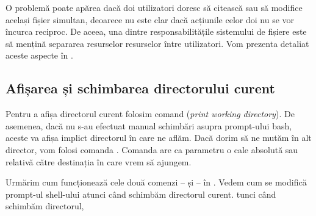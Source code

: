 O problemă poate apărea dacă doi utilizatori doresc să citească sau să modifice același fișier simultan, deoarece nu este clar dacă acțiunile celor doi nu se vor încurca reciproc. De aceea, una dintre responsabilitățile sistemului de fișiere este să mențină separarea resurselor resurselor între utilizatori. Vom prezenta detaliat aceste aspecte în .

\subsection{Afișarea și schimbarea directorului curent}
\label{sec:fs:pwd-cd}

Pentru a afișa directorul curent folosim comand  (\textit{print working directory}). De asemenea, dacă nu s-au efectuat manual schimbări asupra prompt-ului bash, aceste va afișa implict directorul în care ne aflăm. Dacă dorim să ne mutăm în alt director, vom folosi comanda . Comanda  are ca parametru o cale absolută sau relativă către destinația în care vrem să ajungem.

Urmărim cum funcționează cele două comenzi --  și  -- în . Vedem cum se modifică prompt-ul shell-ului atunci când schimbăm directorul curent.  tunci când schimbăm directorul,


